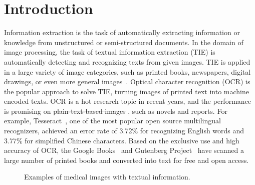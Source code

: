 \section{Introduction}
\label{sec:intro}

Information extraction is the task of automatically extracting information
or knowledge from unstructured or semi-structured documents.
In the domain of image processing,
the task of textual information extraction (TIE)
is automatically detecting and recognizing texts from given images.
TIE is applied in a large variety of image categories,
such as printed books, newspapers, digital drawings,
or even more general images~\cite{jung2004text}.
Optical character recognition (OCR) is the popular approach to solve TIE,
turning images of printed text into machine encoded texts.
OCR is a hot research topic in recent years, and the performance is promising
on \st{plain-text-based images} ,
such as novels and reports.
For example, Tesseract~\cite{smith2007overview},
one of the most popular open source multilingual recognizers,
achieved an error rate of 3.72\% for recognizing English words
and 3.77\% for simplified Chinese characters\cite{smith2009adapting}.
Based on the exclusive use and high accuracy of OCR,
the Google Books~\cite{vincent2007google} and Gutenberg Project~\cite{lebert2008project}
have scanned a large number of printed books
and converted into text for free and open access.

\begin{figure*}[!htb]
\centering
{}
{}
\caption{Examples of medical images with textual information.}
\label{fig:med-image-example}
\end{figure*}



